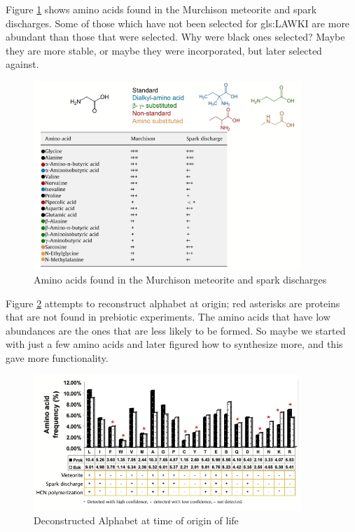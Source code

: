 \documentclass[]{article}
\begin{document}
Figure \ref{fig:PrebioticAminoAcids} \cite{cleaves2010origin} shows amino acids found in the Murchison meteorite and spark discharges. Some of those which have not been selected for \gls{gls:LAWKI} are more abundant than those that were selected. Why were black ones selected? Maybe they are more stable, or maybe they were incorporated, but later selected against.

\begin{figure}[H]
	\caption{Amino acids found in the Murchison meteorite and spark discharges} \label{fig:PrebioticAminoAcids} 
	\includegraphics[width=0.9\textwidth]{PrebioticAminoAcids}
\end{figure}

Figure \ref{fig:ReducedAlphabet} attempts to reconstruct alphabet at origin; red asterisks are proteins that are not found in prebiotic experiments. The amino acids that have low abundances are the ones that are less likely to be formed. So maybe we started with just a few amino acids and later figured how to synthesize more, and this gave more functionality. 
\begin{figure}[H]
	\caption{Deconstructed Alphabet at time of origin of life} \label{fig:ReducedAlphabet} 
	\includegraphics[width=0.9\textwidth]{ReducedAlphabet}
\end{figure}
\end{document}
